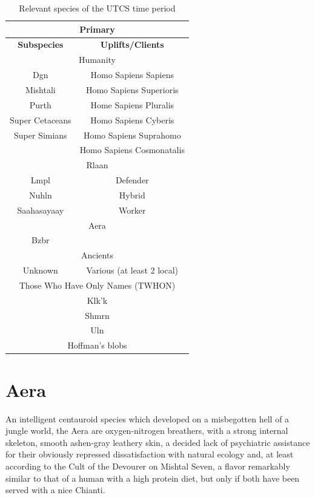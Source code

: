 \label{appendix:appendixA}
\begin{table}[h]
\begin{center}
\begin{tabular}{|c|c|}
\hline
\multicolumn{2}{|c|}{\bf Primary}\\
\hline
{\bf Subspecies} & {\bf Uplifts/Clients }\\
\hline
\hline
\multicolumn{2}{|c|}{Humanity}\\
\hline
Dgn & Homo Sapiens Sapiens\\
Mishtali & Homo Sapiens Superioris\\
Purth & Home Sapiens Pluralis\\
Super Cetaceans & Homo Sapiens Cyberis\\
Super Simians & Homo Sapiens Suprahomo\\
& Homo Sapiens Cosmonatalis\\
\hline
\hline
\multicolumn{2}{|c|}{Rlaan}\\
\hline
Lmpl & Defender\\
Nuhln & Hybrid\\
Saahasayaay & Worker\\
\hline
\hline
\multicolumn{2}{|c|}{Aera}\\
\hline
Bzbr & \\
\hline
\hline
\multicolumn{2}{|c|}{Ancients}\\
\hline
Unknown & Various (at least 2 local) \\
\hline
\hline
\multicolumn{2}{|c|}{Those Who Have Only Names (TWHON)}\\
\hline
\hline
\multicolumn{2}{|c|}{Klk'k}\\
\hline
\hline
\multicolumn{2}{|c|}{Shmrn} \\ 
\hline
\hline
\multicolumn{2}{|c|}{Uln} \\
\hline
\hline
\multicolumn{2}{|c|}{Hoffman's blobs}\\
\hline
\end{tabular}
\caption{Relevant species of the UTCS time period}
\label{table:relevantspecies}
\end{center}
\end{table}

\section{Aera}
\label{appendix:appendixA.1}
An intelligent centauroid species which developed on a misbegotten
hell of a jungle world, the Aera are oxygen-nitrogen breathers, with a
strong internal skeleton, smooth ashen-gray leathery skin, a decided
lack of psychiatric assistance for their obviously repressed
dissatisfaction with natural ecology and, at least according to the
Cult of the Devourer on Mishtal Seven, a flavor remarkably similar to
that of a human with a high protein diet, but only if both have been
served with a nice Chianti.

